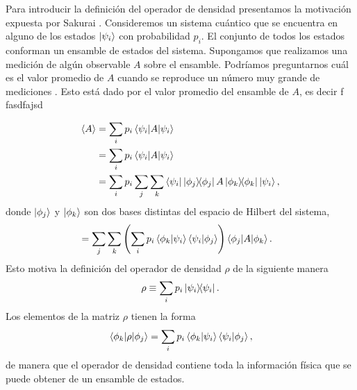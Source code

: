 Para introducir la definición del operador de densidad presentamos la 
motivación expuesta por Sakurai \cite{sakurai_napolitano_2017}.
Consideremos un sistema cuántico que se encuentra en alguno de los estados 
$\ket{\psi_{i} }$ con probabilidad $p_i$. El conjunto de todos los estados
conforman un ensamble de estados del sistema. Supongamos que realizamos 
una medición de algún observable $A$ sobre el ensamble. Podríamos 
preguntarnos cuál es el valor promedio de $A$ cuando se 
reproduce un número muy grande de mediciones \cite{sakurai_napolitano_2017}. 
Esto está dado por el valor promedio del ensamble de $A$, es decir
f
fasdfajsd

\begin{align}
	\expval{A} &= \sum_i p_i \matrixel{\psii}{A}{\psii} \\
	&= \sum_i p_i \matrixel{\psii}{A}{\psii} \\
	&= \sum_ip_i \sum _j\sum _k
	\bra{\psii}\dyad{\phi_j}{\phi_j}A\dyad{\phi_k}{\phi_k}\Pk{i},
\end{align}
donde $\ket{\phi_j}$ y $\ket{\phi_k}$ son dos bases distintas del
espacio de Hilbert del sistema,
\begin{align}
	&= \sum _j\sum _k \qty(\sum_ip_i \braket{\phi_k}{\psii}
	\braket{\psii}{\phi_j})	\matrixel{\phi_j}{A}{\phi_k}.
\end{align}
Esto motiva la definición del operador de densidad $\rho$ 
de la siguiente manera
\begin{equation}
	\rho \equiv \sum _i p_i\dyad{\psi_i}{\psi_i}.
	\label{eq:rho_def}
\end{equation}
Los elementos de la matriz $\rho$ tienen la forma 
\begin{align}
	\matrixel{\phi_k}{\rho}{\phi_j} = 
	\sum_ip_i \braket{\phi_k}{\psii}\braket{\psii}{\phi_j},
\end{align}
de manera que el operador de densidad contiene toda la información 
física que se puede obtener de un ensamble de estados.

